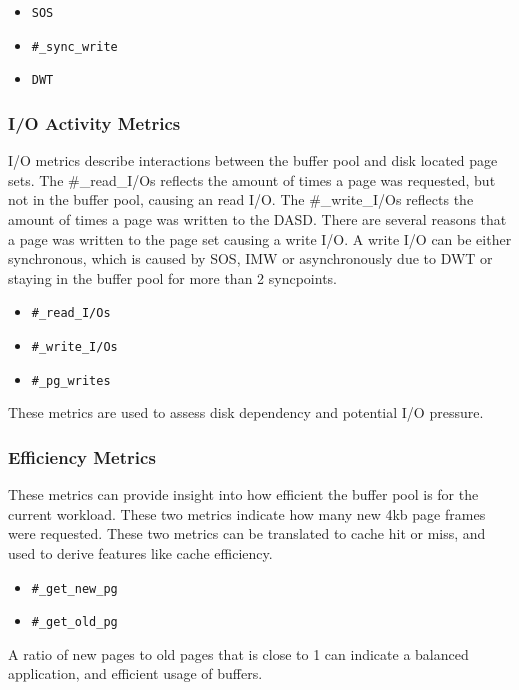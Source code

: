 \begin{itemize}
    \item \texttt{SOS}
    \item \texttt{\#\_sync\_write}
    \item \texttt{DWT}
\end{itemize}
 
 
\subsubsection{I/O Activity Metrics}

I/O metrics describe interactions between the buffer pool and disk located page sets. The \#\_read\_I/Os reflects the amount of times a page was requested, but not in the buffer pool, causing an read I/O. The \#\_write\_I/Os reflects the amount of times a page was written to the DASD. There are several reasons that a page was written to the page set causing a write I/O. A write I/O can be either synchronous, which is caused by SOS, IMW or asynchronously due to DWT or staying in the buffer pool for more than 2 syncpoints. 

\begin{itemize}
    \item \texttt{\#\_read\_I/Os}
    \item \texttt{\#\_write\_I/Os}
    \item \texttt{\#\_pg\_writes}
\end{itemize}

These metrics are used to assess disk dependency and potential I/O pressure.

\subsubsection{Efficiency Metrics}

These metrics can provide insight into how efficient the buffer pool is for the current workload. These two metrics indicate how many new 4kb page frames were requested. These two metrics can be translated to cache hit or miss, and used to derive features like cache efficiency.  

\begin{itemize}
    \item \texttt{\#\_get\_new\_pg}
    \item \texttt{\#\_get\_old\_pg}
\end{itemize}

A ratio of new pages to old pages that is close to 1 can indicate a balanced application, and efficient usage of buffers. 

